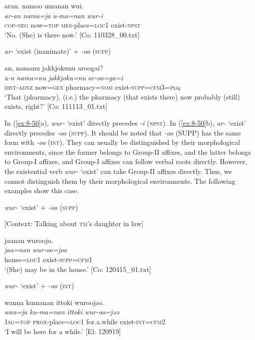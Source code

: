 {\TM}
\glll  aran.  namoo  umanan  wui.\\
\textit{ar-an}  \textit{nama=ja}  \textit{u-ma=nan}  \textit{wur-i}\\
\textsc{cop}-\textsc{neg}  now=\textsc{top}  \textsc{mes}-place=\textsc{loc}1  exist-\textsc{npst}\\
\glt ‘No. (She) is there now.’ [Co: 110328\_00.txt]

\ex \textit{ar-} ‘exist (inanimate)’ + \textit{-oo} (\textsc{supp})

{\TM}
\glll  an,  namanu  {\textbar}jakkjoku{\textbar}nu  aroogai?\\
\textit{a-n}  \textit{nama=nu}  \textit{jakkjoku=nu}  \textit{ar-oo=ga=i}\\
\textsc{dist}-\textsc{adnz}  now=\textsc{gen}  pharmacy=\textsc{nom}  exist-\textsc{supp}=\textsc{cfm3}=\textsc{plq}\\
\glt ‘That (pharmacy), (i.e.) the pharmacy (that exists there) now probably (still) exists, right?’ [Co: 111113\_01.txt]
\z
\z

In (\ref{ex:8-50}a), \textit{wur-} ‘exist’ directly precedes \textit{-i} (\textsc{npst}). In (\ref{ex:8-50}b), \textit{ar-} ‘exist’ directly precedes \textit{-oo} (\textsc{supp}). It should be noted that \textit{-oo} (SUPP) has the same form with \textit{-oo} (\textsc{int}). They can usually be distinguished by their morphological environments, since the former belongs to Group-II affixes, and the latter belongs to Group-I affixes, and Group-I affixes can follow verbal roots directly. However, the existential verb \textit{wur-} ‘exist’ can take Group-II affixes directly. Thus, we cannot distinguish them by their morphological environments. The following examples show this case.

\textbf{\ea\label{ex:8-51}
}\ea \textit{wur-} ‘exist’ + \textit{-oo} (\textsc{supp})

    [Context: Talking about \textsc{tm}’s daughter in law]

{\TM}
\glll  jaanan  wuroojo.\\
\textit{jaa=nan}  \textit{wur-oo=joo}\\
house=\textsc{loc}1  exist-\textsc{supp}=\textsc{cfm1}\\
\glt ‘(She) may be in the house.’ [Co: 120415\_01.txt]

\ex \textit{wur-} ‘exist’ + \textit{-oo} (\textsc{int})

{\TM}
\glll  wanna  kumanan  {\textbar}ittoki{\textbar}  wuroojəə.\\
\textit{wan=ja}  \textit{ku-ma=nan}  \textit{ittoki}  \textit{wur-oo=jəə}\\
1\textsc{sg}=\textsc{top}  \textsc{prox}-place=\textsc{loc}1  for.a.while  exist-\textsc{int}=\textsc{cfm2}\\
\glt ‘I will be here for a while.’ [El: 120919]
\z
\z

